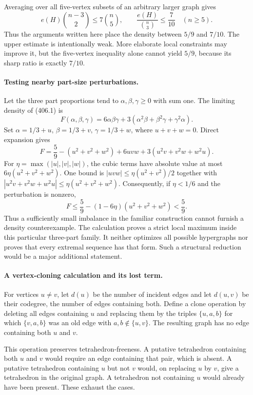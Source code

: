 \documentclass[11pt]{article}
\begin{document}
Averaging over all five-vertex subsets of an arbitrary larger graph gives
\[
 e(H)\binom{n-3}{2}\le7\binom n5,
 \qquad \frac{e(H)}{\binom n3}\le\frac7{10}
 \quad(n\ge5).
 \tag{406.3}
\]
Thus the arguments written here place the density between $5/9$ and $7/10$. The upper estimate is intentionally weak. More elaborate local constraints may improve it, but the five-vertex inequality alone cannot yield $5/9$, because its sharp ratio is exactly $7/10$.

\paragraph{Testing nearby part-size perturbations.}
Let the three part proportions tend to $\alpha,\beta,\gamma\ge0$ with sum one. The limiting density of (406.1) is
\[
 F(\alpha,\beta,\gamma)
 =6\alpha\beta\gamma+3(\alpha^2\beta+\beta^2\gamma+\gamma^2\alpha).
 \tag{406.4}
\]
Set $\alpha=1/3+u$, $\beta=1/3+v$, $\gamma=1/3+w$, where $u+v+w=0$. Direct expansion gives
\[
 F=\frac59-(u^2+v^2+w^2)
        +6uvw+3(u^2v+v^2w+w^2u). \tag{406.5}
\]
For $\eta=\max(|u|,|v|,|w|)$, the cubic terms have absolute value at most $6\eta(u^2+v^2+w^2)$. One bound is $|uvw|\le\eta(u^2+v^2)/2$ together with $|u^2v+v^2w+w^2u|\le\eta(u^2+v^2+w^2)$. Consequently, if $\eta<1/6$ and the perturbation is nonzero,
\[
 F\le\frac59-(1-6\eta)(u^2+v^2+w^2)<\frac59.
 \tag{406.6}
\]
Thus a sufficiently small imbalance in the familiar construction cannot furnish a density counterexample. The calculation proves a strict local maximum inside this particular three-part family. It neither optimizes all possible hypergraphs nor proves that every extremal sequence has that form. Such a structural reduction would be a major additional statement.

\paragraph{A vertex-cloning calculation and its lost term.}
For vertices $u\ne v$, let $d(u)$ be the number of incident edges and let $d(u,v)$ be their codegree, the number of edges containing both. Define a clone operation by deleting all edges containing $u$ and replacing them by the triples $\{u,a,b\}$ for which $\{v,a,b\}$ was an old edge with $a,b\notin\{u,v\}$. The resulting graph has no edge containing both $u$ and $v$.

This operation preserves tetrahedron-freeness. A putative tetrahedron containing both $u$ and $v$ would require an edge containing that pair, which is absent. A putative tetrahedron containing $u$ but not $v$ would, on replacing $u$ by $v$, give a tetrahedron in the original graph. A tetrahedron not containing $u$ would already have been present. These exhaust the cases.
\end{document}
